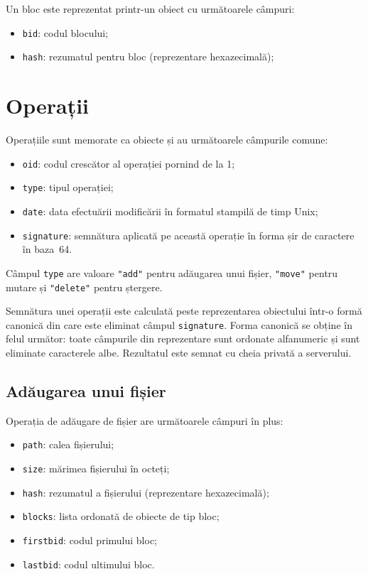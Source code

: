 \documentclass[a4wide,12pt]{report}
\newcommand{\cod}[1]{\texttt{#1}}
\newcommand{\acr}[1]{{\textsmaller[1]{\textsc{#1}}}} %
\begin{document}
Un bloc este reprezentat printr-un obiect \acr{JSON} cu următoarele câmpuri:

\begin{itemize}
    \item \cod{bid}: codul blocului;
    \item \cod{hash}: rezumatul \acr{SHA-256} pentru bloc (reprezentare hexazecimală);
\end{itemize}

\section{Operații} %

Operațiile sunt memorate ca obiecte \acr{JSON} și au următoarele câmpurile comune: 

\begin{itemize}
    \item \cod{oid}: codul crescător al operației pornind de la 1;
    \item \cod{type}: tipul operației;
    \item \cod{date}: data efectuării modificării în formatul stampilă de timp Unix;
    \item \cod{signature}: semnătura aplicată pe această operație în forma șir de caractere în baza~64.
\end{itemize}

Câmpul \cod{type} are valoare \cod{"add"} pentru adăugarea unui fișier, \cod{"move"} pentru mutare și \cod{"delete"}
pentru ștergere.

Semnătura unei operații este calculată peste reprezentarea obiectului \acr{JSON} într-o formă canonică din care este
eliminat câmpul \cod{signature}. Forma canonică se obține în felul următor: toate câmpurile din reprezentare sunt
ordonate alfanumeric și sunt eliminate caracterele albe. Rezultatul este semnat cu cheia privată a serverului.

\subsection{Adăugarea unui fișier} %

Operația de adăugare de fișier are următoarele câmpuri în plus:

\begin{itemize}
    \item \cod{path}: calea fișierului;
    \item \cod{size}: mărimea fișierului în octeți;
    \item \cod{hash}: rezumatul \acr{SHA-256} a fișierului (reprezentare hexazecimală);
    \item \cod{blocks}: lista ordonată de obiecte de tip bloc;
    \item \cod{firstbid}: codul primului bloc;
    \item \cod{lastbid}: codul ultimului bloc.
\end{itemize}
\end{document}
